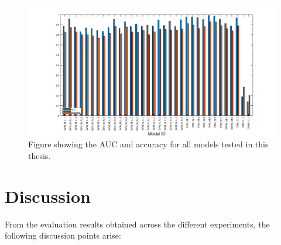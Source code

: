 \begin{figure}[ht]
  \centering
  \includegraphics[width=\textwidth]{figures/all_bar.png}
  \caption{Figure showing the AUC and accuracy for all models tested in this
  thesis.}\label{fig:all_bar}
\end{figure}

\clearpage

\section{Discussion}

From the evaluation results obtained across the different experiments, the
following discussion points arise:

